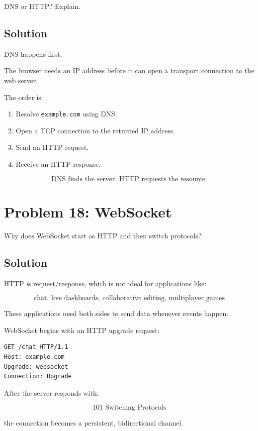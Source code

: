 \documentclass[12pt]{article}
\begin{document}
DNS or HTTP? Explain.

\subsection*{Solution}

DNS happens first.

The browser needs an IP address before it can open a transport connection to the web server.

The order is:

\begin{enumerate}
    \item Resolve \texttt{example.com} using DNS.
    \item Open a TCP connection to the returned IP address.
    \item Send an HTTP request.
    \item Receive an HTTP response.
\end{enumerate}

\[
\boxed{\text{DNS finds the server. HTTP requests the resource.}}
\]

\section*{Problem 18: WebSocket}

Why does WebSocket start as HTTP and then switch protocols?

\subsection*{Solution}

HTTP is request/response, which is not ideal for applications like:

\[
\text{chat, live dashboards, collaborative editing, multiplayer games}
\]

These applications need both sides to send data whenever events happen.

WebSocket begins with an HTTP upgrade request:

\begin{lstlisting}
GET /chat HTTP/1.1
Host: example.com
Upgrade: websocket
Connection: Upgrade
\end{lstlisting}

After the server responds with:

\[
101 \text{ Switching Protocols}
\]

the connection becomes a persistent, bidirectional channel.
\end{document}
